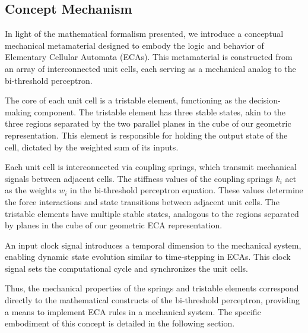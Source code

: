 \subsection*{Concept Mechanism}

In light of the mathematical formalism presented, we introduce a conceptual mechanical metamaterial designed to embody the logic and behavior of Elementary Cellular Automata (ECAs). This metamaterial is constructed from an array of interconnected unit cells, each serving as a mechanical analog to the bi-threshold perceptron.

The core of each unit cell is a tristable element, functioning as the decision-making component. The tristable element has three stable states, akin to the three regions separated by the two parallel planes in the cube of our geometric representation. This element is responsible for holding the output state of the cell, dictated by the weighted sum of its inputs.

Each unit cell is interconnected via coupling springs, which transmit mechanical signals between adjacent cells. The stiffness values of the coupling springs \(k_i\) act as the weights \( w_i \) in the bi-threshold perceptron equation. These values determine the force interactions and state transitions between adjacent unit cells. The tristable elements have multiple stable states, analogous to the regions separated by planes in the cube of our geometric ECA representation.

An input clock signal introduces a temporal dimension to the mechanical system, enabling dynamic state evolution similar to time-stepping in ECAs. This clock signal sets the computational cycle and synchronizes the unit cells.

Thus, the mechanical properties of the springs and tristable elements correspond directly to the mathematical constructs of the bi-threshold perceptron, providing a means to implement ECA rules in a mechanical system. The specific embodiment of this concept is detailed in the following section.

